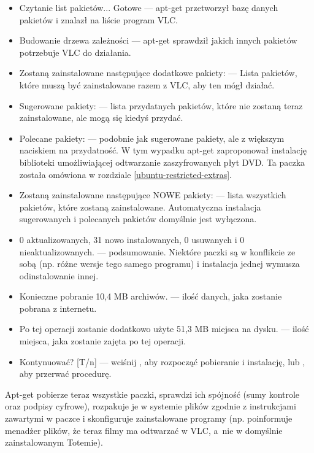 \begin{itemize}
\item \textcolor{ubuntu_orange}{Czytanie list pakietów... Gotowe} --- apt-get przetworzył bazę danych pakietów i znalazł na liście program VLC.
\item \textcolor{ubuntu_orange}{Budowanie drzewa zależności} --- apt-get sprawdził jakich innych pakietów potrzebuje VLC do działania.
\item \textcolor{ubuntu_orange}{Zostaną zainstalowane następujące dodatkowe pakiety:} --- Lista pakietów, które muszą być zainstalowane razem z VLC, aby ten mógł działać.
\item \textcolor{ubuntu_orange}{Sugerowane pakiety:} --- lista przydatnych pakietów, które nie zostaną teraz zainstalowane, ale mogą się kiedyś przydać.
\item \textcolor{ubuntu_orange}{Polecane pakiety:} --- podobnie jak sugerowane pakiety, ale z większym naciskiem na przydatność. W tym wypadku apt-get zaproponował instalację biblioteki umożliwiającej odtwarzanie zaszyfrowanych płyt DVD. Ta paczka została omówiona w rozdziale \ref{ubuntu-restricted-extras}.
\item \textcolor{ubuntu_orange}{Zostaną zainstalowane następujące NOWE pakiety:} --- lista wszystkich pakietów, które zostaną zainstalowane. Automatyczna instalacja sugerowanych i polecanych pakietów domyślnie jest wyłączona.
\item \textcolor{ubuntu_orange}{0 aktualizowanych, 31 nowo instalowanych, 0 usuwanych i 0 nieaktualizowanych.} --- podsumowanie. Niektóre paczki są w konflikcie ze sobą (np. różne wersje tego samego programu) i instalacja jednej wymusza odinstalowanie innej.
\item \textcolor{ubuntu_orange}{Konieczne pobranie 10,4 MB archiwów.} --- ilość danych, jaka zostanie  pobrana z internetu.
\item \textcolor{ubuntu_orange}{Po tej operacji zostanie dodatkowo użyte 51,3 MB miejsca na dysku.} --- ilość miejsca, jaka zostanie zajęta po tej operacji.
\item \textcolor{ubuntu_orange}{Kontynuować? [T/n]} --- wciśnij , aby rozpocząć pobieranie i instalację, lub , aby przerwać procedurę.
\end{itemize}

Apt-get pobierze teraz wszystkie paczki, sprawdzi ich spójność (sumy kontrole oraz podpisy cyfrowe), rozpakuje je w systemie plików zgodnie z instrukcjami zawartymi w paczce i skonfiguruje zainstalowane programy (np. poinformuje menadżer plików, że teraz filmy ma odtwarzać w VLC, a~nie w domyślnie zainstalowanym Totemie).

